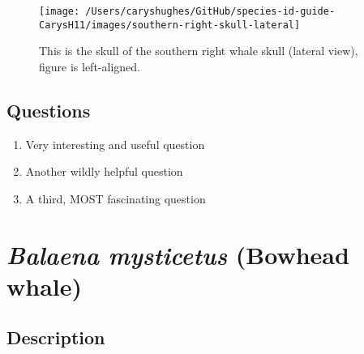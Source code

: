 \documentclass[
]{article}
\providecommand{\tightlist}{%
  \setlength{\itemsep}{0pt}\setlength{\parskip}{0pt}}
\begin{document}
\begin{figure}

\texttt{[image: /Users/caryshughes/GitHub/species-id-guide-CarysH11/images/southern-right-skull-lateral]} \hfill{}

\caption{This is the skull of the southern right whale skull (lateral view), figure is left-aligned.}\label{fig:southern-right-whale-skull-lateral}
\end{figure}

\newpage

\hypertarget{questions}{%
\subsection{Questions}\label{questions}}

\begin{enumerate}
\def\labelenumi{\arabic{enumi}.}
\tightlist
\item
  Very interesting and useful question
\item
  Another wildly helpful question
\item
  A third, MOST fascinating question
\end{enumerate}

\hypertarget{balaena-mysticetus-bowhead-whale}{%
\section{\texorpdfstring{\emph{Balaena mysticetus} (Bowhead
whale)}{Balaena mysticetus (Bowhead whale)}}\label{balaena-mysticetus-bowhead-whale}}

\hypertarget{description-1}{%
\subsection{Description}\label{description-1}}
\end{document}
